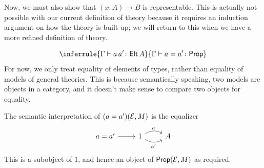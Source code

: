 \documentclass{article}
\begin{document}
\begin{ttrule}[Pi theories]
  Now, we must also show that $(x \colon A) \to B$ is representable. This is actually not possible with our current definition of theory because it requires an induction argument on how the theory is built up; we will return to this when we have a more refined definition of theory.
\end{ttrule}

\begin{ttrule}
  \[\inferrule{\Gamma \yields a\,a' \colon \ms{Elt}\,A}{\Gamma \yields a = a' \colon \ms{Prop}}\]
  For now, we only treat equality of elements of types, rather than equality of models of general theories. This is because semantically speaking, two models are objects in a category, and it doesn't make sense to compare two objects for equality.

  The semantic interpretation of $(a = a')(\mathcal{E}, M)$ is the equalizer
  \[\begin{tikzcd}
      a = a' \ar[r] & 1 \ar[r, "a", bend left] \ar[r, "a'"', bend right] & A
    \end{tikzcd}
  \]
  This is a subobject of $1$, and hence an object of $\mathsf{Prop}(\mathcal{E}, M)$ as required.
\end{ttrule}
\end{document}
